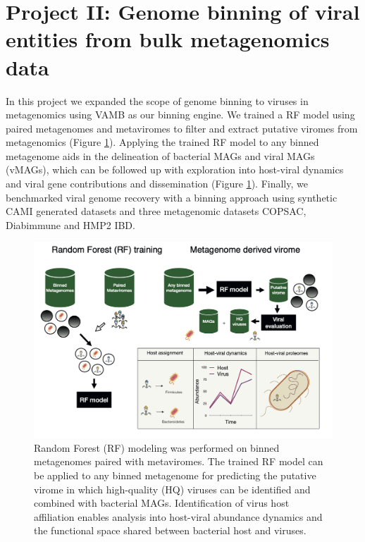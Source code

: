 

\section*{Project II: Genome binning of viral entities from bulk metagenomics data}

In this project we expanded the scope of genome binning to viruses in metagenomics using VAMB as our binning engine. We trained a RF model using paired metagenomes and metaviromes to filter and extract putative viromes from metagenomics (Figure \ref{fig:RF_phamb}). Applying the trained RF model to any binned metagenome aids in the delineation of bacterial MAGs and viral MAGs (vMAGs), which can be followed up with exploration into host-viral dynamics and viral gene contributions and dissemination (Figure \ref{fig:RF_phamb}). Finally, we benchmarked viral genome recovery with a binning approach using synthetic CAMI generated datasets and three metagenomic datasets COPSAC, Diabimmune and HMP2 IBD.


\begin{figure}
  \begin{center}
    \includegraphics[scale=1,width=1\textwidth]{pictures/RF_phamb.png}
  \end{center}
  \caption[VirusTimeline]{Random Forest (RF) modeling was performed on binned metagenomes paired with metaviromes. The trained RF model can be applied to any binned metagenome for predicting the putative virome in which high-quality (HQ) viruses can be identified and combined with bacterial MAGs. Identification of virus host affiliation enables analysis into host-viral abundance dynamics and the functional space shared between bacterial host and viruses.
  }
  \label{fig:RF_phamb}
\end{figure}

